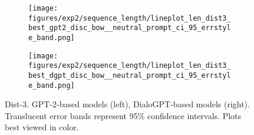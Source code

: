 \begin{figure}[H]
     \centering
     \begin{subfigure}[b]{0.49\textwidth}
        \centering
\texttt{[image: figures/exp2/sequence\_length/lineplot\_len\_dist3\_best\_gpt2\_disc\_bow\_\_neutral\_prompt\_ci\_95\_errstyle\_band.png]}
        \caption{}
        \label{subfig:lineplot_length_dist3_np_gpt2}
     \end{subfigure}
     \hfill
     \begin{subfigure}[b]{0.49\textwidth}
        \centering
        \texttt{[image: figures/exp2/sequence\_length/lineplot\_len\_dist3\_best\_dgpt\_disc\_bow\_\_neutral\_prompt\_ci\_95\_errstyle\_band.png]}
        \caption{}
        \label{subfig:lineplot_length_dist3_np_dgpt}
     \end{subfigure}
        \caption{Dist-3. GPT-2-based models (left), DialoGPT-based models (right). Translucent error bands represent 95\% confidence intervals. Plots best viewed in color.}
        \label{fig:lineplots_length_dist3_np_gpt2_dgpt}
\end{figure}


